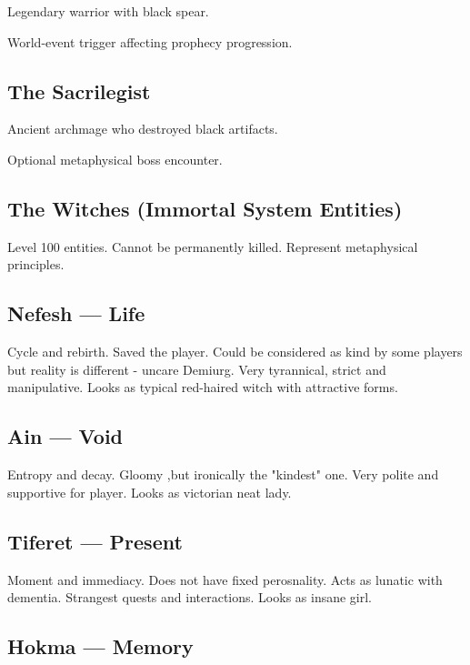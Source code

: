 \documentclass[a4paper,12pt]{article}
\begin{document}
Legendary warrior with black spear.

World-event trigger affecting prophecy progression.



\subsection{The Sacrilegist}

Ancient archmage who destroyed black artifacts.

Optional metaphysical boss encounter.



\subsection{The Witches (Immortal System Entities)}

Level 100 entities. Cannot be permanently killed. Represent metaphysical principles.

\subsection{Nefesh — Life}

Cycle and rebirth. Saved the player. Could be considered as kind by some players but reality is different - uncare Demiurg. Very tyrannical, strict and manipulative. Looks as typical red-haired witch with attractive forms.

\subsection{Ain — Void}

Entropy and decay. Gloomy ,but ironically the "kindest" one. Very polite and supportive for player. Looks as victorian neat lady. 

\subsection{Tiferet — Present}

Moment and immediacy. Does not have fixed perosnality. Acts as lunatic with dementia. Strangest quests and interactions. Looks as insane girl.

\subsection{Hokma — Memory}
\end{document}
